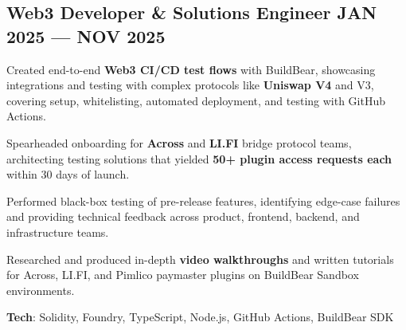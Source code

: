 \documentclass[letter,10pt]{article}
\begin{document}
\subsection{{Web3 Developer \& Solutions Engineer \hfill JAN 2025 --- NOV 2025}}
\begin{zitemize}
  \item Created end-to-end \textbf{Web3 CI/CD test flows} with BuildBear, showcasing integrations and testing with complex protocols like \textbf{Uniswap V4} and V3, covering setup, whitelisting, automated deployment, and testing with GitHub Actions.
  \item Spearheaded onboarding for \textbf{Across} and \textbf{LI.FI} bridge protocol teams, architecting testing solutions that yielded \textbf{50+ plugin access requests each} within 30 days of launch.
  \item Performed black-box testing of pre-release features, identifying edge-case failures and providing technical feedback across product, frontend, backend, and infrastructure teams.
  \item Researched and produced in-depth \textbf{video walkthroughs} and written tutorials for Across, LI.FI, and Pimlico paymaster plugins on BuildBear Sandbox environments.
  \item \textbf{Tech}: Solidity, Foundry, TypeScript, Node.js, GitHub Actions, BuildBear SDK
\end{zitemize}


\end{document}
